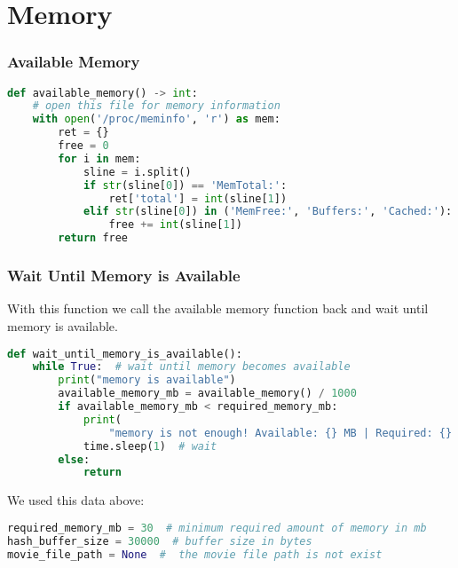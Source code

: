 \documentclass[onecolumn]{article}
\begin{document}
\section{Memory}

\subsubsection{Available Memory  }

\begin{lstlisting}[language=Python, caption=  Available memory]
def available_memory() -> int:
    # open this file for memory information  
    with open('/proc/meminfo', 'r') as mem:
        ret = {}
        free = 0
        for i in mem:
            sline = i.split()
            if str(sline[0]) == 'MemTotal:':
                ret['total'] = int(sline[1])
            elif str(sline[0]) in ('MemFree:', 'Buffers:', 'Cached:'):
                free += int(sline[1])
        return free

\end{lstlisting}

\subsubsection{Wait Until Memory  is Available}

With this function we call the available memory function back and wait until memory is available. 

\begin{lstlisting}[language=Python, caption=  Waiting Available memory]
def wait_until_memory_is_available():
    while True:  # wait until memory becomes available
        print("memory is available")
        available_memory_mb = available_memory() / 1000
        if available_memory_mb < required_memory_mb:  
            print(
                "memory is not enough! Available: {} MB | Required: {} MB".format(available_memory_mb, required_memory_mb))
            time.sleep(1)  # wait 
        else:
            return  

\end{lstlisting}

We used this data above:\\

\begin{lstlisting}[language=Python, caption=  Data that I should have]
required_memory_mb = 30  # minimum required amount of memory in mb
hash_buffer_size = 30000  # buffer size in bytes 
movie_file_path = None  #  the movie file path is not exist 
\end{lstlisting}
\end{document}
